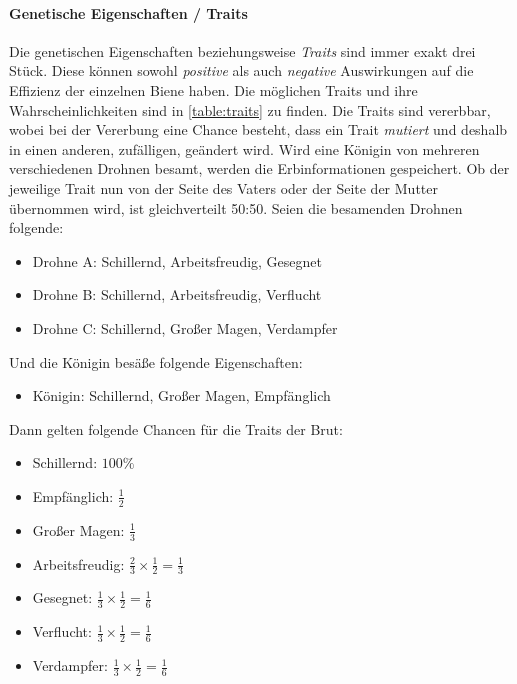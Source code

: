 \paragraph{Genetische Eigenschaften / Traits} 
Die genetischen Eigenschaften beziehungsweise \textit{Traits} sind immer exakt drei Stück. Diese können sowohl \textit{positive} als auch \textit{negative} Auswirkungen auf die Effizienz der einzelnen Biene haben. Die möglichen Traits und ihre Wahrscheinlichkeiten sind in \autoref{table:traits} zu finden. Die Traits sind vererbbar, wobei bei der Vererbung eine Chance besteht, dass ein Trait \textit{mutiert} und deshalb in einen anderen, zufälligen, geändert wird. Wird eine Königin von mehreren verschiedenen Drohnen besamt, werden die Erbinformationen gespeichert. Ob der jeweilige Trait nun von der Seite des Vaters oder der Seite der Mutter übernommen wird, ist gleichverteilt 50:50. Seien die besamenden Drohnen folgende:

\begin{itemize}
    \item Drohne A: Schillernd, Arbeitsfreudig, Gesegnet
    \item Drohne B: Schillernd, Arbeitsfreudig, Verflucht
    \item Drohne C: Schillernd, Großer Magen, Verdampfer
\end{itemize}

Und die Königin besäße folgende Eigenschaften:

\begin{itemize}
    \item Königin: Schillernd, Großer Magen, Empfänglich
\end{itemize}

Dann gelten folgende Chancen für die Traits der Brut:

\begin{itemize}
    \item Schillernd: $100\%$
    \item Empfänglich: $\frac{1}{2}$
    \item Großer Magen: $\frac{1}{3}$
    \item Arbeitsfreudig: $\frac{2}{3} \times \frac{1}{2} = \frac{1}{3}$
    \item Gesegnet: $\frac{1}{3} \times \frac{1}{2} = \frac{1}{6}$
    \item Verflucht: $\frac{1}{3} \times \frac{1}{2} = \frac{1}{6}$
    \item Verdampfer: $\frac{1}{3} \times \frac{1}{2} = \frac{1}{6}$
\end{itemize}

